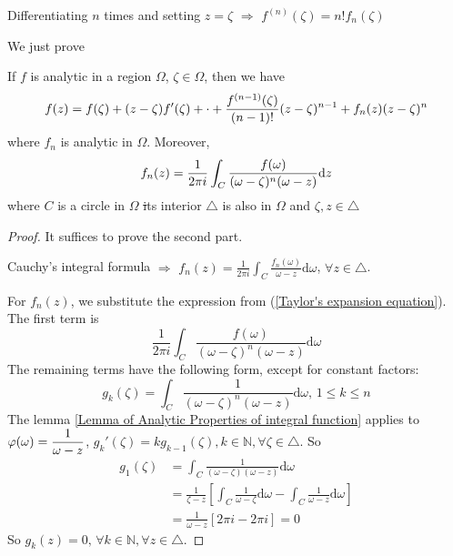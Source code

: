Differentiating  $ n $ times and setting  $ z=\zeta $ $ \Rightarrow $ $ f^{(n)}(\zeta) =n!f_n(\zeta)$    

We just prove 
\begin{theorem}\label{Taylor's Theorem}
    If  $ f $ is analytic in a region  $ \Omega $,  $ \zeta\in\Omega $, then we have 
    \begin{equation}
        f(z)=f(\zeta)+(z-\zeta)f'(\zeta)+\cdot+\displaystyle\frac{f^{(n-1)}(\zeta)}{(n-1)!}(z-\zeta)^{n-1}+f_n(z)(z-\zeta)^n\label{Taylor's expansion equation}
    \end{equation}   
    where  $ f_n $ is analytic in  $ \Omega $. Moreover,
    \begin{equation}
        f_n(z)=\displaystyle\frac{1}{2\pi i}\int_C\frac{f(\omega)}{(\omega-\zeta)^n(\omega-z)}\mathrm{d}z
    \end{equation}  
    where  $ C $ is a circle in  $ \Omega $ \st  its interior  $ \triangle $ is also in  $ \Omega $ and  $ \zeta,z\in \triangle $     
\end{theorem}
\begin{proof}
    It suffices to prove the second part.
    
    Cauchy's integral formula $ \Rightarrow  $ $ f_n(z)=\frac{1}{2\pi i}\int_C\frac{f_n(\omega)}{\omega-z}\mathrm{d}\omega $, $ \forall z\in\triangle $.
    
    For  $ f_n(z) $, we substitute the expression from  (\ref{Taylor's expansion equation}). The first term is 
    \begin{equation}
        \frac{1}{2\pi i}\int_C\frac{f(\omega)}{(\omega-\zeta)^n(\omega-z)}\mathrm{d}\omega
    \end{equation}
    The remaining terms have the following form, except for constant factors:
    \begin{equation}
        g_k(\zeta)=\int_C\frac{1}{(\omega-\zeta)^n(\omega-z)}\mathrm{d}\omega,\,1 \leq k \leq n
    \end{equation}
    The lemma \ref{Lemma of Analytic Properties of integral function} applies to  $ \varphi(\omega)=\displaystyle\frac{1}{\omega-z} $,  $ g_k'(\zeta)=kg_{k-1}(\zeta),k\in\mathbb{N},\forall \zeta\in\triangle $. So 
    \begin{equation}
        \begin{aligned}
            g_1(\zeta)&=\int_C\frac{1}{(\omega-\zeta)(\omega-z)}\mathrm{d}\omega\\
            &=\frac{1}{\zeta-z}\left[\int_C\frac{1}{\omega-\zeta}\mathrm{d}\omega-\int_C\frac{1}{\omega-z}\mathrm{d}\omega\right]\\
            &=\frac{1}{\omega-z}[2\pi i-2\pi i]=0
        \end{aligned}
    \end{equation}  
    So  $ g_k(z)=0,\,\forall k\in\mathbb{N},\forall z\in\triangle $. 
\end{proof}

